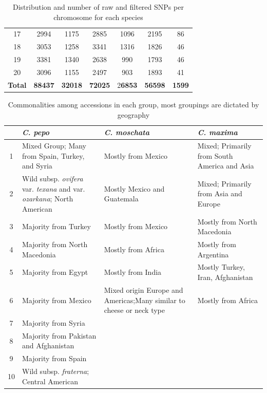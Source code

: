 \documentclass[utf8]{FrontiersinHarvard} %
\begin{document}
\begin{table}[h]
\begin{center}
\begin{tabular}{c c c c c c c}
	17 & 2994 & 1175 & 2885 & 1096 & 2195 & 86 \\
	18 & 3053 & 1258 & 3341 & 1316 & 1826 & 46 \\
	19 & 3381 & 1340 & 2638 & 990 & 1793 & 46 \\
	20 & 3096 & 1155 & 2497 & 903 & 1893 & 41 \\
	\hline
	\textbf{Total} & \textbf{88437} & \textbf{32018} & \textbf{72025} & 2\textbf{6853} & \textbf{56598} & \textbf{1599} \\
	\hline
\end{tabular}
	\caption{Distribution and number of raw and filtered SNPs per chromosome for each species \label{tbl:1}}
	\end{center}
\end{table}

\clearpage

\begin{table}[h]
	\begin{center}
	\begin{tabular}{c p{5cm} p{5cm} p{5cm}}
		\hline
& \textbf{\emph{C. pepo}} & \textbf{\emph{C. moschata}} & \textbf{\emph{C. maxima}} \\
\hline
1 & Mixed Group; Many from Spain, Turkey, and Syria & Mostly from Mexico & Mixed; Primarily from South America and Asia \\
2 & Wild subsp. \emph{ovifera} var. \emph{texana} and var. \emph{ozarkana}; North American & Mostly Mexico and Guatemala & Mixed; Primarily from Asia and Europe \\
3 & Majority from Turkey & Mostly from Mexico & Mostly from North Macedonia \\
4 & Majority from North Macedonia & Mostly from Africa & Mostly from Argentina \\
5 & Majority from Egypt & Mostly from India & Mostly Turkey, Iran, Afghanistan \\
6 & Majority from Mexico & Mixed origin Europe and Americas;Many similar to cheese or neck type & Mostly from Africa \\
7 & Majority from Syria & & \\
8 & Majority from Pakistan and Afghanistan & & \\
9 & Majority from Spain & & \\
10 & Wild subsp. \emph{fraterna}; Central American & & \\
\hline
	\end{tabular}
	\caption{Commonalities among accessions in each group, most groupings are dictated by geography \label{tbl:2}}
	\end{center}
\end{table}
\end{document}
